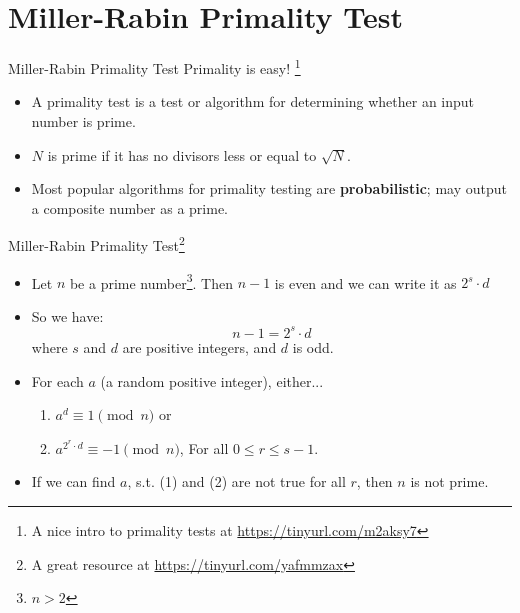 \documentclass{beamer}
\begin{document}
\section{Miller-Rabin Primality Test}

\begin{frame}{Miller-Rabin Primality Test}
    Primality is easy! \footnote{A nice intro to primality tests at \url{https://tinyurl.com/m2aksy7}}
    \begin{itemize}
        \item A primality test is a test or algorithm for determining whether an input number is prime.
        \item $N$ is prime if it has no divisors less or equal to $\sqrt{N}$.
        \item Most popular algorithms for primality testing are \textbf{probabilistic}; may output a composite number as a prime.
    \end{itemize}
\end{frame}

\begin{frame}{Miller-Rabin Primality Test\footnote{A great resource at \url{https://tinyurl.com/yafmmzax}}}
    \begin{itemize}
        \item Let $n$ be a prime number\footnote{$n > 2$}. Then $n - 1$ is even and we can write it as $2^{s} \cdot d$
        \item So we have: $$n - 1 = 2^{s} \cdot d$$where $s$ and $d$ are positive integers, and $d$ is odd. 
        \item For each $a$ (a random positive integer), either...
        \begin{enumerate}
            \item $a^{d} \equiv 1 \pmod n$ or    
            \item $a^{2^r \cdot d} \equiv -1 \pmod n$, {\scriptsize For all $0 \leq r \leq s - 1$.}
        \end{enumerate}
        \item If we can find $a$, s.t. (1) and (2) are not true for all $r$, then $n$ is not prime.
    \end{itemize}
\end{frame}
\end{document}
